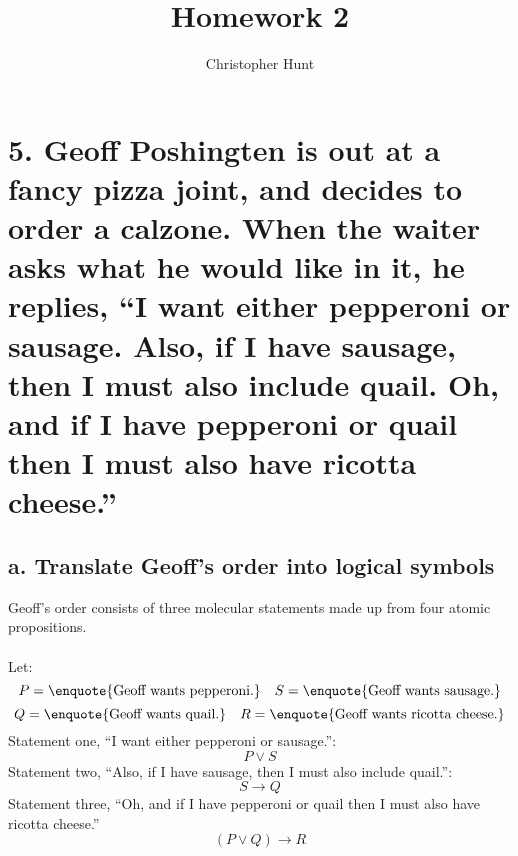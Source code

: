 \documentclass[11pt]{article}
\title{Homework 2}
\author{Christopher Hunt}
\date{}
\begin{document}
\pagestyle{fancy}
\fancyhf{}
\rhead{\thepage}
\maketitle
 \section*{5. Geoff Poshingten is out at a fancy pizza joint, and decides to order a calzone. When the waiter asks what he would like in it, he replies, \enquote{I want either pepperoni or sausage. Also, if I have sausage, then I must also include quail. Oh, and if I have pepperoni or quail then I must also have ricotta cheese.}}
\subsection*{a. Translate Geoff's order into logical symbols}
Geoff's order consists of three molecular statements made up from four atomic propositions.
\\
\\
Let:
$$P = \text{\enquote{Geoff wants pepperoni.}} \quad S = \text{\enquote{Geoff wants sausage.}} $$
$$Q = \text{\enquote{Geoff wants quail.}} \quad R = \text{\enquote{Geoff wants ricotta cheese.}}$$
Statement one, \enquote{I want either pepperoni or sausage.}:
$$P \vee S$$
Statement two, \enquote{Also, if I have sausage, then I must also include quail.}:
$$S \rightarrow Q$$
Statement three, \enquote{Oh, and if I have pepperoni or quail then I must also have ricotta cheese.}
$$(P\vee Q) \rightarrow R$$
\end{document}
